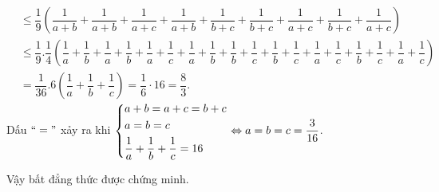 \begin{bt}
{\begin{enumerate}
\begin{align*}
			&\le \dfrac{1}{9} \left( \dfrac{1}{a+b} +\dfrac{1}{a+b}+\dfrac{1}{a+c}+\dfrac{1}{a+b}+\dfrac{1}{b+c}+\dfrac{1}{b+c}+\dfrac{1}{a+c}+\dfrac{1}{b+c}+\dfrac{1}{a+c} \right)\\
			&\le \dfrac{1}{9}.\dfrac{1}{4} \left( \dfrac{1}{a}+\dfrac{1}{b}+\dfrac{1}{a}+\dfrac{1}{b}+\dfrac{1}{a}+\dfrac{1}{c}+\dfrac{1}{a}+\dfrac{1}{b}+\dfrac{1}{b}+\dfrac{1}{c}+\dfrac{1}{b}+\dfrac{1}{c}+\dfrac{1}{a}+\dfrac{1}{c}+\dfrac{1}{b}+\dfrac{1}{c}+\dfrac{1}{a}+\dfrac{1}{c} \right)\\
			&=\dfrac{1}{36}.6 \left(\dfrac{1}{a}+\dfrac{1}{b}+\dfrac{1}{c} \right) = \dfrac{1}{6}\cdot16=\dfrac{8}{3}.
			\end{align*}
			Dấu $``="$ xảy ra khi $\left\{\begin{aligned}&a+b=a+c=b+c\\&a=b=c\\&\dfrac{1}{a}+\dfrac{1}{b}+\dfrac{1}{c}=16\end{aligned}\right. \Leftrightarrow a=b=c=\dfrac{3}{16}$.
			\par Vậy bất đẳng thức được chứng minh.
		\end{enumerate}
	}
\end{bt}
